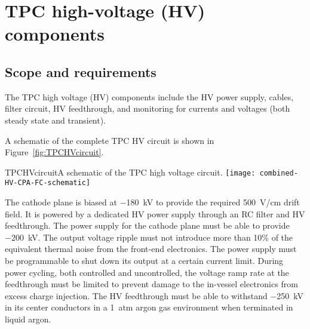 




\section{TPC high-voltage (HV) components}

\subsection{Scope and requirements}

The TPC high voltage (HV) components include the HV power supply, cables,
filter circuit, HV feedthrough,  and monitoring for currents and voltages (both steady
state and transient).

A schematic of the complete TPC HV circuit is shown in Figure~\ref{fig:TPCHVcircuit}.

\begin{cdrfigure}{TPCHVcircuit}{A schematic of the TPC high voltage circuit.}
  \texttt{[image: combined-HV-CPA-FC-schematic]}
\end{cdrfigure}

The cathode plane is biased at \SI{-180}{kV} to provide the
required \SI{500}{V/cm} drift field.  It is 
powered by a dedicated HV power supply through an RC filter and HV 
feedthrough.  The power supply for the cathode plane must be able
to provide \SI{-200}{kV}.  The output voltage
ripple must not introduce more than 10\% 
of the equivalent thermal
noise from the front-end electronics. The power supply must be
programmable to shut down its output at a certain current
limit. During power cycling, both controlled and uncontrolled, the voltage 
ramp rate at the feedthrough must be limited
to prevent damage to the in-vessel electronics from excess charge
injection. The HV feedthrough must be able to withstand \SI{-250}{kV}
in its center conductors in a \SI{1}{atm} argon gas environment when
terminated in liquid argon.


